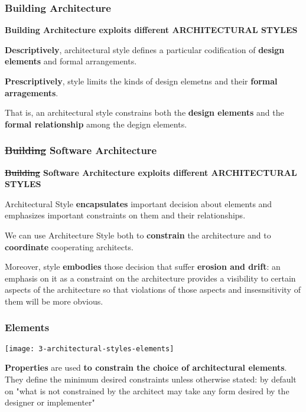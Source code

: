 \subsubsection{Building Architecture}
\textbf{Building Architecture exploits different ARCHITECTURAL STYLES}

\textbf{Descriptively}, architectural style defines a particular codification of \textbf{design elements} and formal arrangements.

\textbf{Prescriptively}, style limits the kinds of design elemetns and their \textbf{formal arragements}.

That is, an architectural style constrains both the \textbf{design elements} and the \textbf{formal relationship} among the degign elements.

\subsubsection{\sout{Building} Software Architecture}

\textbf{\sout{Building} Software Architecture exploits different ARCHITECTURAL STYLES}

Architectural Style \textbf{encapsulates} important decision about elements and emphasizes important constraints on them and their relationships. 

We can use Architecture Style both to \textbf{constrain} the architecture and to \textbf{coordinate} cooperating architects.

Moreover, style \textbf{embodies} those decision that suffer \textbf{erosion and drift}: an emphasis on it as a constraint on the architecture provides a visibility to certain aspects of the architecture so that violations of those aspects and insesnsitivity of them will be more obvious.

\subsubsection{Elements}

\begin{center}
\texttt{[image: 3-architectural-styles-elements]}
\end{center}

\textbf{Properties} are used \textbf{to constrain the choice of architectural elements}. They define the minimum desired constraints unless otherwise stated: by default on "what is not constrained by the architect may take any form desired by the designer or implementer"


